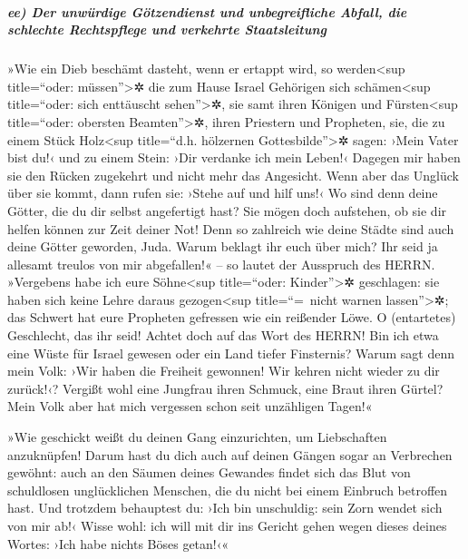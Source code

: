 \hypertarget{ee-der-unwuxfcrdige-guxf6tzendienst-und-unbegreifliche-abfall-die-schlechte-rechtspflege-und-verkehrte-staatsleitung}{%
\subparagraph{ee) Der unwürdige Götzendienst und unbegreifliche Abfall,
die schlechte Rechtspflege und verkehrte
Staatsleitung}\label{ee-der-unwuxfcrdige-guxf6tzendienst-und-unbegreifliche-abfall-die-schlechte-rechtspflege-und-verkehrte-staatsleitung}}

»Wie ein Dieb beschämt dasteht, wenn er ertappt wird, so
werden\textless sup title=``oder: müssen''\textgreater✲ die zum Hause
Israel Gehörigen sich schämen\textless sup title=``oder: sich enttäuscht
sehen''\textgreater✲, sie samt ihren Königen und Fürsten\textless sup
title=``oder: obersten Beamten''\textgreater✲, ihren Priestern und
Propheten, sie, die zu einem Stück Holz\textless sup
title=``d.h. hölzernen Gottesbilde''\textgreater✲ sagen: ›Mein Vater
bist du!‹ und zu einem Stein: ›Dir verdanke ich mein Leben!‹ Dagegen mir
haben sie den Rücken zugekehrt und nicht mehr das Angesicht. Wenn aber
das Unglück über sie kommt, dann rufen sie: ›Stehe auf und hilf uns!‹
Wo sind denn deine Götter, die du dir selbst angefertigt
hast? Sie mögen doch aufstehen, ob sie dir helfen können zur Zeit deiner
Not! Denn so zahlreich wie deine Städte sind auch deine Götter geworden,
Juda. Warum beklagt ihr euch über mich? Ihr seid ja
allesamt treulos von mir abgefallen!« -- so lautet der Ausspruch des
HERRN. »Vergebens habe ich eure Söhne\textless sup
title=``oder: Kinder''\textgreater✲ geschlagen: sie haben sich keine
Lehre daraus gezogen\textless sup title=``=~nicht warnen
lassen''\textgreater✲; das Schwert hat eure Propheten gefressen wie ein
reißender Löwe. O (entartetes) Geschlecht, das ihr seid!
Achtet doch auf das Wort des HERRN! Bin ich etwa eine Wüste für Israel
gewesen oder ein Land tiefer Finsternis? Warum sagt denn mein Volk: ›Wir
haben die Freiheit gewonnen! Wir kehren nicht wieder zu dir zurück!‹?
Vergißt wohl eine Jungfrau ihren Schmuck, eine Braut
ihren Gürtel? Mein Volk aber hat mich vergessen schon seit unzähligen
Tagen!«

»Wie geschickt weißt du deinen Gang einzurichten, um
Liebschaften anzuknüpfen! Darum hast du dich auch auf deinen Gängen
sogar an Verbrechen gewöhnt: auch an den Säumen deines
Gewandes findet sich das Blut von schuldlosen unglücklichen Menschen,
die du nicht bei einem Einbruch betroffen hast. Und
trotzdem behauptest du: ›Ich bin unschuldig: sein Zorn wendet sich von
mir ab!‹ Wisse wohl: ich will mit dir ins Gericht gehen wegen dieses
deines Wortes: ›Ich habe nichts Böses getan!‹«

